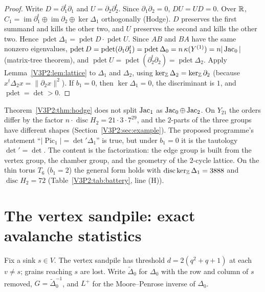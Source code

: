\begin{proof}
Write $D=\partial_1^{t}\partial_1$ and $U=\partial_2\partial_2^{t}$. Since $\partial_1\partial_2=0$,
$DU=UD=0$. Over $\mathbb{R}$, $C_1=\operatorname{im}\partial_1^{t}\oplus\operatorname{im}\partial_2
\oplus\ker\Delta_1$ orthogonally (Hodge). $D$ preserves the first summand and kills the other
two, and $U$ preserves the second and kills the other two. Hence
$\operatorname{pdet}\Delta_1=\operatorname{pdet}D\cdot\operatorname{pdet}U$. Since $AB$ and
$BA$ have the same nonzero eigenvalues,
$\operatorname{pdet}D=\operatorname{pdet}(\partial_1\partial_1^{t})=\operatorname{pdet}\Delta_0
=n\,\kappa(Y^{(1)})=n|\operatorname{Jac}_0|$ (matrix-tree theorem), and $\operatorname{pdet}U=
\operatorname{pdet}(\partial_2^{t}\partial_2)=\operatorname{pdet}\Delta_2$. Apply
Lemma~\ref{V3P2:lem:lattice} to $\Delta_1$ and $\Delta_2$, using
$\ker_{\mathbb{Z}}\Delta_2=\ker_{\mathbb{Z}}\partial_2$ (because $x^{t}\Delta_2x=\|\partial_2x\|^{2}$). If
$b_1=0$, then $\ker\Delta_1=0$, the discriminant is $1$, and $\operatorname{pdet}=\det>0$.
\end{proof}

\begin{remark}\label{V3P2:rem:notgroups}
Theorem~\ref{V3P2:thm:hodge} does not split $\operatorname{Jac}_1$ as $\operatorname{Jac}_0\oplus\operatorname{Jac}_2$. On $Y_{21}$ the
orders differ by the factor $n\cdot\operatorname{disc}H_2=21\cdot3\cdot7^{29}$, and the
$2$-parts of the three groups have different shapes (Section~\ref{V3P2:sec:example}). The
proposed programme's statement ``$|\operatorname{Pic}_1|=\det'\Delta_1$'' is true, but under
$b_1=0$ it is the tautology $\det'=\det$. The content is the factorization: the edge group
is built from the vertex group, the chamber group, and the geometry of the $2$-cycle
lattice. On the thin torus $T_6$ ($b_1=2$) the general form holds with
$\operatorname{disc}\ker_{\mathbb{Z}}\Delta_1=3888$ and $\operatorname{disc}H_2=72$
(Table~\ref{V3P2:tab:battery}, line (H)).
\end{remark}

\section{The vertex sandpile: exact avalanche statistics}\label{V3P2:sec:vertex}

Fix a sink $s\in V$. The vertex sandpile has threshold $d=2(q^{2}+q+1)$ at each $v\neq s$;
grains reaching $s$ are lost. Write $\widetilde\Delta_0$ for $\Delta_0$ with the row and
column of $s$ removed, $G=\widetilde\Delta_0^{-1}$, and $L^{+}$ for the Moore--Penrose inverse
of $\Delta_0$.

